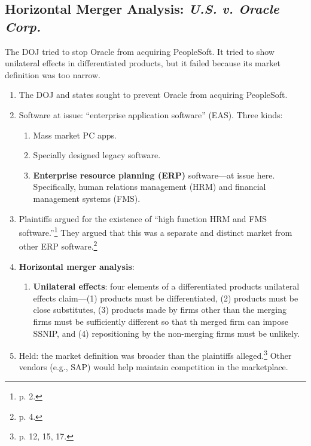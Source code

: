 \subsection{Horizontal Merger Analysis: \emph{U.S. v. Oracle Corp.}}

The DOJ tried to stop Oracle from acquiring PeopleSoft. It tried to show 
unilateral effects in differentiated products, but it failed because its 
market definition was too narrow.

\begin{enumerate}
    \item The DOJ and states sought to prevent Oracle from acquiring 
    PeopleSoft.
    \item Software at issue: ``enterprise application software'' (EAS). Three 
    kinds:
    \begin{enumerate}
        \item Mass market PC apps.
        \item Specially designed legacy software.
        \item \textbf{Enterprise resource planning (ERP)} software---at issue 
        here. Specifically, human relations management (HRM) and financial 
        management systems (FMS).
    \end{enumerate}
    \item Plaintiffs argued for the existence of ``high function HRM and FMS 
    software.''\footnote{p. 2.} They argued that this was a separate and 
    distinct market from other ERP software.\footnote{p. 4.}
    \item \textbf{Horizontal merger analysis}:
    \begin{enumerate}
        \label{oracle-unilateral-effects}
        \item \textbf{Unilateral effects}: four elements of a differentiated 
        products unilateral effects claim---(1) products must be 
        differentiated, (2) products must be close substitutes, (3) products 
        made by firms other than the merging firms must be sufficiently 
        different so that th merged firm can impose SSNIP, and (4) 
        repositioning by the non-merging firms must be unlikely.
    \end{enumerate}
    \item Held: the market definition was broader than the plaintiffs 
    alleged.\footnote{p. 12, 15, 17.} Other vendors (e.g., SAP) would help 
    maintain competition in the marketplace.
\end{enumerate}

